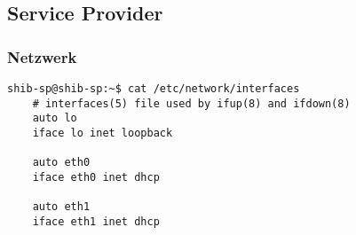 \subsection{Service Provider}
\subsubsection{Netzwerk}
\begin{lstlisting}
shib-sp@shib-sp:~$ cat /etc/network/interfaces
	# interfaces(5) file used by ifup(8) and ifdown(8)
	auto lo
	iface lo inet loopback

	auto eth0
	iface eth0 inet dhcp

	auto eth1
	iface eth1 inet dhcp
\end{lstlisting}

